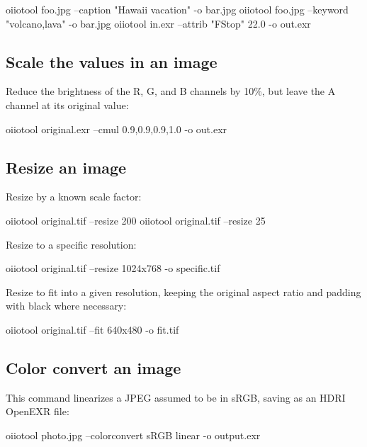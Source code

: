 \begin{code}
    oiiotool foo.jpg --caption "Hawaii vacation" -o bar.jpg
    oiiotool foo.jpg --keyword "volcano,lava" -o bar.jpg
    oiiotool in.exr --attrib "FStop" 22.0 -o out.exr
\end{code}


\subsection*{Scale the values in an image}

Reduce the brightness of the R, G, and B channels by 10\%,
but leave the A channel at its original value:

\begin{code}
    oiiotool original.exr --cmul 0.9,0.9,0.9,1.0 -o out.exr
\end{code}

\subsection*{Resize an image}

Resize by a known scale factor:

\begin{code}
    oiiotool original.tif --resize 200%
    oiiotool original.tif --resize 25%
\end{code}

\noindent Resize to a specific resolution:

\begin{code}
    oiiotool original.tif --resize 1024x768 -o specific.tif
\end{code}

\noindent Resize to fit into a given resolution, keeping the original
aspect ratio and padding with black where necessary:

\begin{code}
    oiiotool original.tif --fit 640x480 -o fit.tif
\end{code}


\subsection*{Color convert an image}

This command linearizes a JPEG assumed to be in sRGB, saving as
an HDRI OpenEXR file:

\begin{code}
    oiiotool photo.jpg --colorconvert sRGB linear -o output.exr
\end{code}

